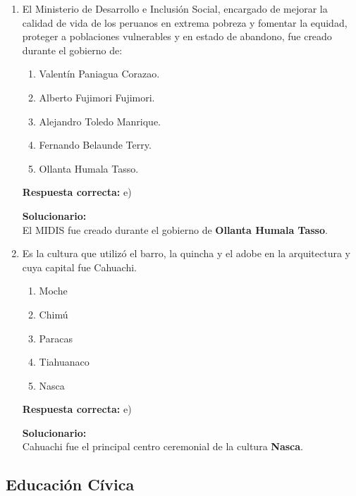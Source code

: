 \begin{enumerate}
	
	\item El Ministerio de Desarrollo e Inclusión Social, encargado de mejorar la calidad de vida de los peruanos en extrema pobreza y fomentar la equidad, proteger a poblaciones vulnerables y en estado de abandono, fue creado durante el gobierno de:
	\begin{enumerate}[label=\alph*)]
		\item Valentín Paniagua Corazao.
		\item Alberto Fujimori Fujimori.
		\item Alejandro Toledo Manrique.
		\item Fernando Belaunde Terry.
		\item Ollanta Humala Tasso.
	\end{enumerate}
	\textbf{Respuesta correcta:} e)
	
	\vspace{2mm}
	\textbf{Solucionario:}\\
	El MIDIS fue creado durante el gobierno de \textbf{Ollanta Humala Tasso}.
	
	\vspace{6mm}
	
	\item Es la cultura que utilizó el barro, la quincha y el adobe en la arquitectura y cuya capital fue Cahuachi.
	\begin{enumerate}[label=\alph*)]
		\item Moche
		\item Chimú
		\item Paracas
		\item Tiahuanaco
		\item Nasca
	\end{enumerate}
	\textbf{Respuesta correcta:} e)
	
	\vspace{2mm}
	\textbf{Solucionario:}\\
	Cahuachi fue el principal centro ceremonial de la cultura \textbf{Nasca}.
	
	\vspace{6mm}
	
\end{enumerate}

\subsection*{Educación Cívica}

